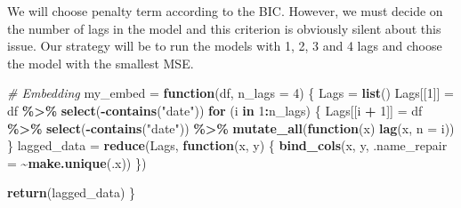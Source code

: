 \documentclass[
]{article}
\newenvironment{Shaded}{\begin{snugshade}}{\end{snugshade}}
\newcommand{\AttributeTok}[1]{\textcolor[rgb]{0.13,0.29,0.53}{#1}}
\newcommand{\CommentTok}[1]{\textcolor[rgb]{0.56,0.35,0.01}{\textit{#1}}}
\newcommand{\ControlFlowTok}[1]{\textcolor[rgb]{0.13,0.29,0.53}{\textbf{#1}}}
\newcommand{\DecValTok}[1]{\textcolor[rgb]{0.00,0.00,0.81}{#1}}
\newcommand{\FunctionTok}[1]{\textcolor[rgb]{0.13,0.29,0.53}{\textbf{#1}}}
\newcommand{\NormalTok}[1]{#1}
\newcommand{\OtherTok}[1]{\textcolor[rgb]{0.56,0.35,0.01}{#1}}
\newcommand{\SpecialCharTok}[1]{\textcolor[rgb]{0.81,0.36,0.00}{\textbf{#1}}}
\newcommand{\StringTok}[1]{\textcolor[rgb]{0.31,0.60,0.02}{#1}}
\begin{document}
We will choose penalty term according to the BIC. However, we must
decide on the number of lags in the model and this criterion is
obviously silent about this issue. Our strategy will be to run the
models with 1, 2, 3 and 4 lags and choose the model with the smallest
MSE.

\begin{Shaded}
\begin{Highlighting}[]
\CommentTok{\# Embedding}
\NormalTok{my\_embed }\OtherTok{=} \ControlFlowTok{function}\NormalTok{(df, }\AttributeTok{n\_lags =} \DecValTok{4}\NormalTok{) \{}
\NormalTok{    Lags }\OtherTok{=} \FunctionTok{list}\NormalTok{()}
\NormalTok{    Lags[[}\DecValTok{1}\NormalTok{]] }\OtherTok{=}\NormalTok{ df }\SpecialCharTok{\%\textgreater{}\%}
        \FunctionTok{select}\NormalTok{(}\SpecialCharTok{{-}}\FunctionTok{contains}\NormalTok{(}\StringTok{"date"}\NormalTok{))}
    \ControlFlowTok{for}\NormalTok{ (i }\ControlFlowTok{in} \DecValTok{1}\SpecialCharTok{:}\NormalTok{n\_lags) \{}
\NormalTok{        Lags[[i }\SpecialCharTok{+} \DecValTok{1}\NormalTok{]] }\OtherTok{=}\NormalTok{ df }\SpecialCharTok{\%\textgreater{}\%}
            \FunctionTok{select}\NormalTok{(}\SpecialCharTok{{-}}\FunctionTok{contains}\NormalTok{(}\StringTok{"date"}\NormalTok{)) }\SpecialCharTok{\%\textgreater{}\%}
            \FunctionTok{mutate\_all}\NormalTok{(}\ControlFlowTok{function}\NormalTok{(x) }\FunctionTok{lag}\NormalTok{(x, }\AttributeTok{n =}\NormalTok{ i))}
\NormalTok{    \}}
\NormalTok{    lagged\_data }\OtherTok{=} \FunctionTok{reduce}\NormalTok{(Lags, }\ControlFlowTok{function}\NormalTok{(x, y) \{}
        \FunctionTok{bind\_cols}\NormalTok{(x, y, }\AttributeTok{.name\_repair =} \SpecialCharTok{\textasciitilde{}}\FunctionTok{make.unique}\NormalTok{(.x))}
\NormalTok{    \})}

    \FunctionTok{return}\NormalTok{(lagged\_data)}
\NormalTok{\}}
\end{Highlighting}
\end{Shaded}
\end{document}
